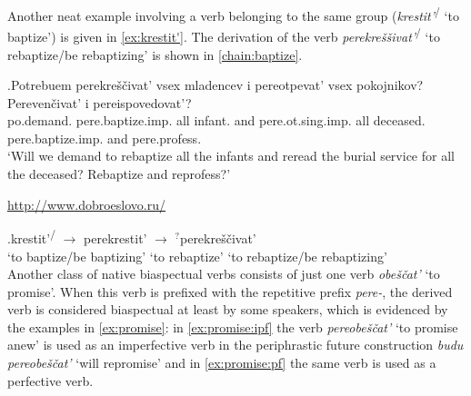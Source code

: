 Another neat example involving a verb belonging to the same group (\textit{krestit'}\textsuperscript{\IPF\slash\PF} `to baptize') is given in \ref{ex:krestit'}. The derivation of the verb \textit{perekre\v{s}\v{s}ivat'}\textsuperscript{\IPF\slash\PF} `to rebaptize/be rebaptizing' is shown in \ref{chain:baptize}.

\exg.\label{ex:krestit'}Potrebuem perekre\v{s}\v{c}ivat' vsex mladencev i pereotpevat' vsex pokojnikov? Pereven\v{c}ivat' i pereispovedovat'?\\
po.demand. pere.baptize.imp. all infant. and pere.ot.sing.imp. all deceased. pere.baptize.imp. and pere.profess.\\
\trans `Will we demand to rebaptize all the infants and reread the burial service for all the deceased? Rebaptize and reprofess?'
\begin{flushright}
\vspace{-0.5em}
\url{http://www.dobroeslovo.ru/}
\end{flushright}


\exg.\label{chain:baptize}krestit'\textsuperscript{\IPF\slash\PF} $\rightarrow$ perekrestit'\textsuperscript{\PF} $\rightarrow$ $^?$perekre\v{s}\v{c}ivat'\textsuperscript{\IPF}\\
{`to baptize/be baptizing'} {} {`to rebaptize'} {} {`to rebaptize/be rebaptizing'}\\

Another class of native biaspectual verbs consists of just one verb \textit{obe\v{s}\v{c}at'} `to promise'. When this verb is prefixed with the repetitive prefix \textit{pere-}, the derived verb is considered biaspectual at least by some speakers, which is evidenced by the examples in \ref{ex:promise}: in \ref{ex:promise:ipf} the verb \textit{pereobe\v{s}\v{c}at'} `to promise anew' is used as an imperfective verb in the periphrastic future construction \textit{budu pereobe\v{s}\v{c}at'} `will repromise' and in \ref{ex:promise:pf} the same verb is used as a perfective verb. 

